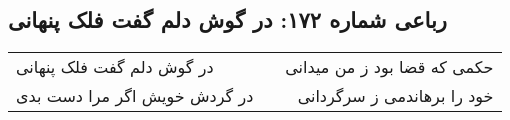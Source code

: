 \begin{center}
\section*{رباعی شماره ۱۷۲: در گوش دلم گفت فلک پنهانی}
\label{sec:sh172}
\begin{longtable}{l p{0.5cm} r}
در گوش دلم گفت فلک پنهانی
&&
حکمی که قضا بود ز من میدانی
\\
در گردش خویش اگر مرا دست بدی
&&
خود را برهاندمی ز سرگردانی
\\
\end{longtable}
\end{center}
